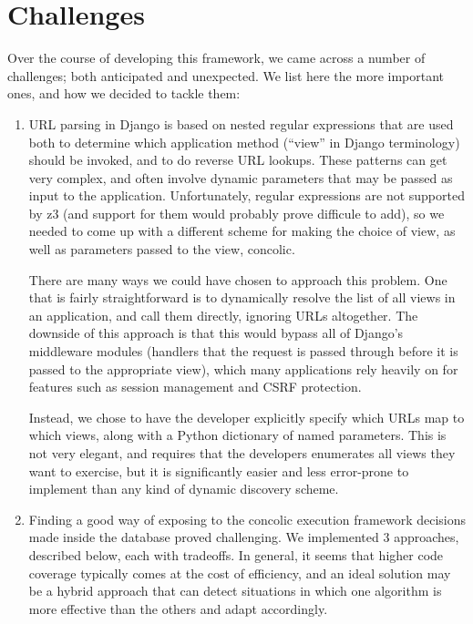\documentclass{scrartcl}
\begin{document}
\section{Challenges}
Over the course of developing this framework, we came across a number of
challenges; both anticipated and unexpected. We list here the more important
ones, and how we decided to tackle them:
\begin{enumerate}
	\item URL parsing in Django is based on nested regular expressions that
		are used both to determine which application method (``view''
		in Django terminology) should be invoked, and to do reverse URL
		lookups. These patterns can get very complex, and often involve
		dynamic parameters that may be passed as input to the
		application. Unfortunately, regular expressions are not
		supported by z3 (and support for them would probably prove
		difficule to add), so we needed to come up with a different
		scheme for making the choice of view, as well as parameters
		passed to the view, concolic.

		There are many ways we could have chosen to approach this
		problem. One that is fairly straightforward is to dynamically
		resolve the list of all views in an application, and call them
		directly, ignoring URLs altogether.  The downside of this
		approach is that this would bypass all of Django's middleware
		modules (handlers that the request is passed through before it
		is passed to the appropriate view), which many applications
		rely heavily on for features such as session management and
		CSRF protection.

		Instead, we chose to have the developer explicitly specify
		which URLs map to which views, along with a Python dictionary
		of named parameters. This is not very elegant, and requires
		that the developers enumerates all views they want to exercise,
		but it is significantly easier and less error-prone to
		implement than any kind of dynamic discovery scheme.

	\item Finding a good way of exposing to the concolic execution framework
    decisions made inside the database proved challenging. We implemented 3
    approaches, described below, each with tradeoffs. In general, it seems
    that higher code coverage typically comes at the cost of efficiency, and an
    ideal solution may be a hybrid approach that can detect situations in which
    one algorithm is more effective than the others and adapt accordingly. 


\end{enumerate}
\end{document}
